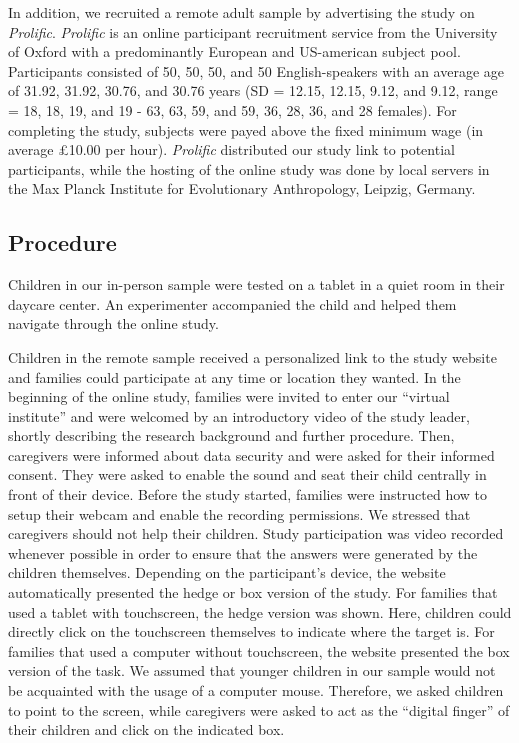 \documentclass[
  man,floatsintext]{apa6}
\begin{document}
In addition, we recruited a remote adult sample by advertising the study on \emph{Prolific}. \emph{Prolific} is an online participant recruitment service from the University of Oxford with a predominantly European and US-american subject pool. Participants consisted of 50, 50, 50, and 50 English-speakers with an average age of 31.92, 31.92, 30.76, and 30.76 years (SD = 12.15, 12.15, 9.12, and 9.12, range = 18, 18, 19, and 19 - 63, 63, 59, and 59, 36, 28, 36, and 28 females).
For completing the study, subjects were payed above the fixed minimum wage (in average £10.00 per hour). \emph{Prolific} distributed our study link to potential participants, while the hosting of the online study was done by local servers in the Max Planck Institute for Evolutionary Anthropology, Leipzig, Germany.

\hypertarget{procedure}{%
\subsection{Procedure}\label{procedure}}

Children in our in-person sample were tested on a tablet in a quiet room in their daycare center. An experimenter accompanied the child and helped them navigate through the online study.

Children in the remote sample received a personalized link to the study website and families could participate at any time or location they wanted. In the beginning of the online study, families were invited to enter our ``virtual institute'' and were welcomed by an introductory video of the study leader, shortly describing the research background and further procedure. Then, caregivers were informed about data security and were asked for their informed consent. They were asked to enable the sound and seat their child centrally in front of their device. Before the study started, families were instructed how to setup their webcam and enable the recording permissions. We stressed that caregivers should not help their children. Study participation was video recorded whenever possible in order to ensure that the answers were generated by the children themselves.
Depending on the participant's device, the website automatically presented the hedge or box version of the study. For families that used a tablet with touchscreen, the hedge version was shown. Here, children could directly click on the touchscreen themselves to indicate where the target is. For families that used a computer without touchscreen, the website presented the box version of the task. We assumed that younger children in our sample would not be acquainted with the usage of a computer mouse. Therefore, we asked children to point to the screen, while caregivers were asked to act as the ``digital finger'' of their children and click on the indicated box.
\end{document}
